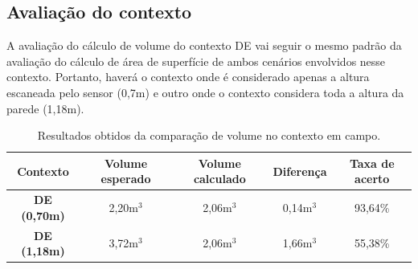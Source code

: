 \subsection{Avaliação do contexto}

A avaliação do cálculo de volume do contexto DE vai seguir o mesmo padrão da avaliação do cálculo de área de superfície de ambos cenários envolvidos nesse contexto.
Portanto, haverá o contexto onde é considerado apenas a altura escaneada pelo sensor (0,7m) e outro onde o contexto considera toda a altura da parede (1,18m).

\begin{table}[H]
    \centering
    \caption{Resultados obtidos da comparação de volume no contexto em campo.}
    \begin{tabular}{@{}ccccc@{}}
        \toprule
        \textbf{Contexto} & \textbf{Volume esperado} & \textbf{Volume calculado} & \textbf{Diferença} & \textbf{Taxa de acerto} \\ \midrule
        \textbf{DE (0,70m)} & 2,20m$^3$ & 2,06m$^3$ & 0,14m$^3$ & 93,64\% \\
        \textbf{DE (1,18m)} & 3,72m$^3$ & 2,06m$^3$ & 1,66m$^3$ & 55,38\% \\ \bottomrule
    \end{tabular}
    \label{tab:result_inloco_vol}
\end{table}